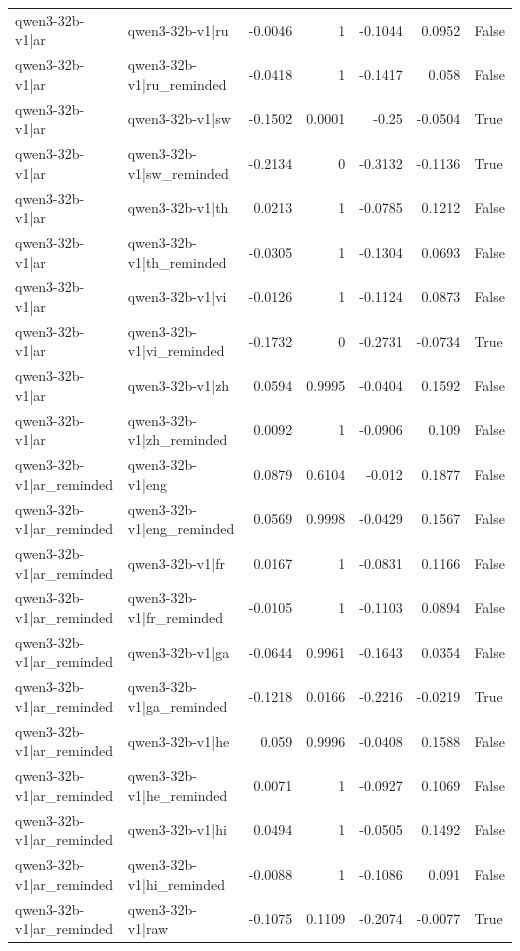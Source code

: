 \begin{table}
\begin{tabular}{l l r r r r l}
qwen3-32b-v1|ar & qwen3-32b-v1|ru & -0.0046 & 1 & -0.1044 & 0.0952 & False \\
qwen3-32b-v1|ar & qwen3-32b-v1|ru_reminded & -0.0418 & 1 & -0.1417 & 0.058 & False \\
qwen3-32b-v1|ar & qwen3-32b-v1|sw & -0.1502 & 0.0001 & -0.25 & -0.0504 & True \\
qwen3-32b-v1|ar & qwen3-32b-v1|sw_reminded & -0.2134 & 0 & -0.3132 & -0.1136 & True \\
qwen3-32b-v1|ar & qwen3-32b-v1|th & 0.0213 & 1 & -0.0785 & 0.1212 & False \\
qwen3-32b-v1|ar & qwen3-32b-v1|th_reminded & -0.0305 & 1 & -0.1304 & 0.0693 & False \\
qwen3-32b-v1|ar & qwen3-32b-v1|vi & -0.0126 & 1 & -0.1124 & 0.0873 & False \\
qwen3-32b-v1|ar & qwen3-32b-v1|vi_reminded & -0.1732 & 0 & -0.2731 & -0.0734 & True \\
qwen3-32b-v1|ar & qwen3-32b-v1|zh & 0.0594 & 0.9995 & -0.0404 & 0.1592 & False \\
qwen3-32b-v1|ar & qwen3-32b-v1|zh_reminded & 0.0092 & 1 & -0.0906 & 0.109 & False \\
qwen3-32b-v1|ar_reminded & qwen3-32b-v1|eng & 0.0879 & 0.6104 & -0.012 & 0.1877 & False \\
qwen3-32b-v1|ar_reminded & qwen3-32b-v1|eng_reminded & 0.0569 & 0.9998 & -0.0429 & 0.1567 & False \\
qwen3-32b-v1|ar_reminded & qwen3-32b-v1|fr & 0.0167 & 1 & -0.0831 & 0.1166 & False \\
qwen3-32b-v1|ar_reminded & qwen3-32b-v1|fr_reminded & -0.0105 & 1 & -0.1103 & 0.0894 & False \\
qwen3-32b-v1|ar_reminded & qwen3-32b-v1|ga & -0.0644 & 0.9961 & -0.1643 & 0.0354 & False \\
qwen3-32b-v1|ar_reminded & qwen3-32b-v1|ga_reminded & -0.1218 & 0.0166 & -0.2216 & -0.0219 & True \\
qwen3-32b-v1|ar_reminded & qwen3-32b-v1|he & 0.059 & 0.9996 & -0.0408 & 0.1588 & False \\
qwen3-32b-v1|ar_reminded & qwen3-32b-v1|he_reminded & 0.0071 & 1 & -0.0927 & 0.1069 & False \\
qwen3-32b-v1|ar_reminded & qwen3-32b-v1|hi & 0.0494 & 1 & -0.0505 & 0.1492 & False \\
qwen3-32b-v1|ar_reminded & qwen3-32b-v1|hi_reminded & -0.0088 & 1 & -0.1086 & 0.091 & False \\
qwen3-32b-v1|ar_reminded & qwen3-32b-v1|raw & -0.1075 & 0.1109 & -0.2074 & -0.0077 & True \\

\end{tabular}
\end{table}
